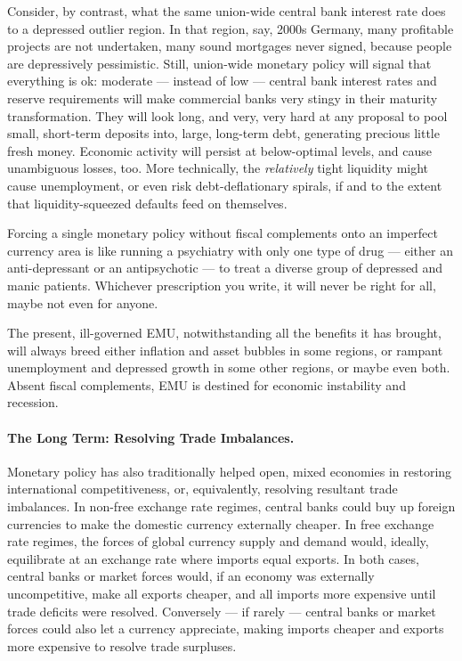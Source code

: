 \documentclass[11pt,a4paper,oneside]{article}
\begin{document}
Consider, by contrast, what the same union-wide central bank interest rate does to a depressed outlier region.
In that region, say, 2000s Germany, many profitable projects are not undertaken, many sound mortgages never signed, because people are depressively pessimistic.
Still, union-wide monetary policy will signal that everything is ok:
moderate --- instead of low --- central bank interest rates and reserve requirements will make commercial banks very stingy in their maturity transformation.
They will look long, and very, very hard at any proposal to pool small, short-term deposits into, large, long-term debt, generating precious little fresh money.
Economic activity will persist at below-optimal levels, and cause unambiguous losses, too.
More technically, the \emph{relatively} tight liquidity might cause unemployment, or even risk debt-deflationary spirals, if and to the extent that liquidity-squeezed defaults feed on themselves.

Forcing a single monetary policy without fiscal complements onto an imperfect currency area is like running a psychiatry with only one type of drug --- either an anti-depressant or an antipsychotic --- to treat a diverse group of depressed and manic patients.
Whichever prescription you write, it will never be right for all, maybe not even for anyone.

The present, ill-governed \gls{EMU}, notwithstanding all the benefits it has brought, will always breed either inflation and asset bubbles in some regions, or rampant unemployment and depressed growth in some other regions, or maybe even both.
Absent fiscal complements, \gls{EMU} is destined for economic instability and recession.

\paragraph[Long Term]{The Long Term:
Resolving Trade Imbalances.}
Monetary policy has also traditionally helped open, mixed economies in restoring international competitiveness, or, equivalently, resolving resultant trade imbalances.
In non-free exchange rate regimes, central banks could buy up foreign currencies to make the domestic currency externally cheaper.
In free exchange rate regimes, the forces of global currency supply and demand would, ideally, equilibrate at an exchange rate where imports equal exports. In both cases, central banks or market forces would, if an economy was externally uncompetitive, make all exports cheaper, and all imports more expensive until trade deficits were resolved.
Conversely --- if rarely --- central banks or market forces could also let a currency appreciate, making imports cheaper and exports more expensive to resolve trade surpluses.
\end{document}
